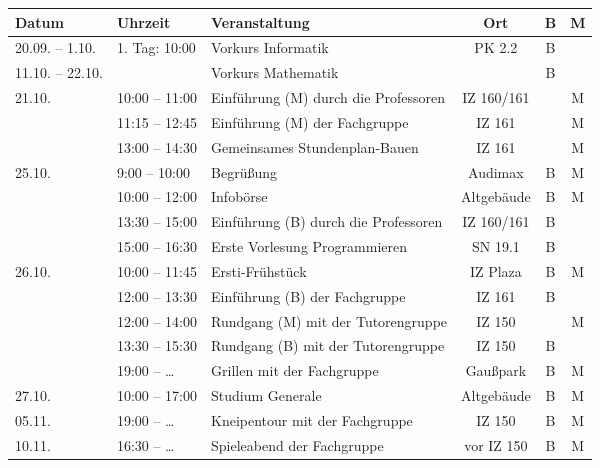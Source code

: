 \begin{figure}[h]
\begin{tabular}{|l|l|p{6.7cm}|c|c|c|}
\hline \textbf{Datum} & \textbf{Uhrzeit} & \textbf{Veranstaltung}	& \textbf{Ort} & \textbf{B} & \textbf{M} \\
\hline 20.09. – 1.10.
				& 1. Tag: 10:00	 & Vorkurs Informatik					& PK 2.2		&B& \\
\hline 11.10. – 22.10. 
				&	 	 		 & Vorkurs Mathematik 					&				&B& \\
\hline 21.10.
				& 10:00 – 11:00	 & Einführung (M) \newline durch die Professoren	& IZ 160/161	& &M\\
\hline 			& 11:15 – 12:45	 & Einführung (M) der Fachgruppe		& IZ 161		& &M\\
\hline 			& 13:00 – 14:30	 & Gemeinsames Stundenplan-Bauen		& IZ 161		& &M\\
\hline 25.10.	&  9:00 – 10:00	 & Begrüßung							& Audimax		&B&M\\
\hline 			& 10:00 – 12:00	 & Infobörse							& Altgebäude	&B&M\\
\hline 			& 13:30 – 15:00	 & Einführung (B) \newline durch die Professoren	& IZ 160/161	&B& \\
\hline 			& 15:00 – 16:30	 & Erste Vorlesung Programmieren		& SN 19.1		&B& \\
\hline 26.10.	& 10:00 – 11:45	 & Ersti-Frühstück						& IZ Plaza		&B&M\\
\hline 			& 12:00 – 13:30	 & Einführung (B) der Fachgruppe		& IZ 161		&B& \\
\hline 			& 12:00 – 14:00	 & Rundgang (M) \newline mit der Tutorengruppe	& IZ 150		& &M\\
\hline 			& 13:30 – 15:30	 & Rundgang (B) \newline mit der Tutorengruppe	& IZ 150		&B& \\
\hline 			& 19:00 – \ldots & Grillen mit der Fachgruppe			& Gaußpark		&B&M\\
\hline 27.10.	& 10:00 – 17:00	 & Studium Generale						& Altgebäude	&B&M\\
\hline 05.11.	& 19:00 – \ldots & Kneipentour mit der Fachgruppe		& IZ 150		&B&M\\
\hline 10.11.	& 16:30 – \ldots & Spieleabend der Fachgruppe			& vor IZ 150	&B&M\\ 
\end{tabular} 
\end{figure}

\newpage

